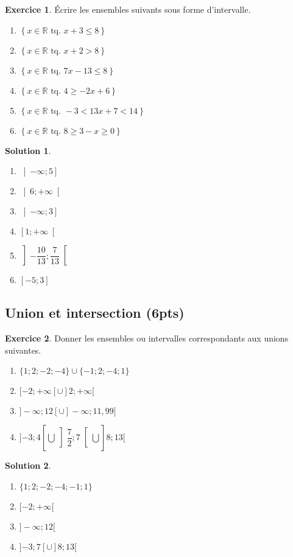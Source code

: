 \documentclass[a4paper, 14pt]{extarticle}
\theoremstyle{plain}
\newtheorem*{sol}{Solution}
\theoremstyle{definition}
\newtheorem{ex}{Exercice}
\newcommand{\R}{\mathbb{R}}
\newcommand{\xRtq}[1]{
	$\left\{ x \in \R \text{ tq. } #1 \right\}$
}
\newcommand{\pinfty}{{+}\infty}
\newcommand{\minfty}{{-}\infty}
\newcommand{\exe}[2]{
		\begin{ex} #1  \end{ex}
		\begin{sol} #2 \end{sol}
	}
\newcommand{\exe}[2]{
		\begin{ex} #1  \end{ex}
	}
\begin{document}
\exe{
	Écrire les ensembles suivants sous forme d'intervalle.
	
	\begin{multicols}{2}
	\begin{enumerate}
		\item \xRtq{x + 3 \leq 8}
		\item \xRtq{x + 2 > 8}
		\item \xRtq{7x  - 13 \leq 8}
		\item \xRtq{4 \geq -2x + 6}
		\item \xRtq{-3 < 13x + 7 < 14}
		\item \xRtq{8 \geq 3 - x \geq 0}
	\end{enumerate}
	\end{multicols}
}
{


	\begin{multicols}{2}
	\begin{enumerate}
		\item $\left]-\infty ; 5\right]$
		\item $\left]6 ; +\infty\right[$
		\item $\left]-\infty; 3 \right]$
		\item $\left[1 ; +\infty \right[$
		\item $\left] -\dfrac{10}{13} ; \dfrac{7}{13} \right[$
		\item $\left[ -5 ; 3 \right]$\
	\end{enumerate}
	\end{multicols}
}

\subsection*{Union et intersection (6pts)}

\exe{
	Donner les ensembles ou intervalles correspondants aux unions suivantes.
	\begin{multicols}{2}
	\begin{enumerate}
		\item $\{ 1 ; 2 ; -2 ; -4 \} \cup \{  -1; 2 ; -4 ; 1\}$
		\item $[{-}2 ; \pinfty[ \cup ]2 ; \pinfty[$
		\item $ ]\minfty ; 12[ \cup ]\minfty ; 11{,}99]$
		\item $]{-3};4[ \bigcup \left]\dfrac72; 7\right[ \bigcup ]8; 13[$
	\end{enumerate}
	\end{multicols}
}
{

	\begin{multicols}{2}
	\begin{enumerate}
		\item $\{1;2;-2;-4;-1;1\}$
		\item $[{-}2 ; \pinfty[$
		\item $ ]\minfty ; 12[$
		\item $]{-3};7[ \cup ]8; 13[$
	\end{enumerate}
	\end{multicols}

}
\end{document}
